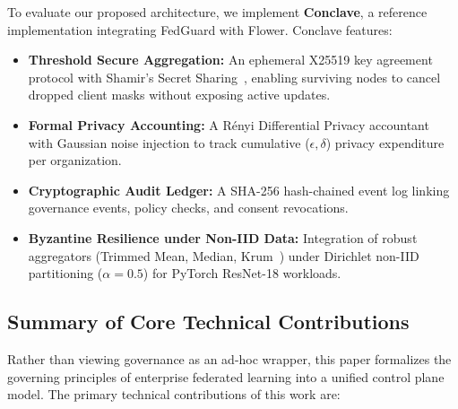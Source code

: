 To evaluate our proposed architecture, we implement \textbf{Conclave}, a reference implementation integrating FedGuard with Flower. Conclave features:
\begin{itemize}
    \item \textbf{Threshold Secure Aggregation:} An ephemeral X25519 key agreement protocol with Shamir's Secret Sharing~\cite{bonawitz2017practical, so2021lightsecagg}, enabling surviving nodes to cancel dropped client masks without exposing active updates.
    \item \textbf{Formal Privacy Accounting:} A R\'enyi Differential Privacy accountant~\cite{mironov2017renyi} with Gaussian noise injection to track cumulative ($\epsilon, \delta$) privacy expenditure per organization.
    \item \textbf{Cryptographic Audit Ledger:} A SHA-256 hash-chained event log linking governance events, policy checks, and consent revocations.
    \item \textbf{Byzantine Resilience under Non-IID Data:} Integration of robust aggregators (Trimmed Mean, Median, Krum~\cite{blanchard2017machine, yin2018byzantine}) under Dirichlet non-IID partitioning ($\alpha=0.5$) for PyTorch ResNet-18 workloads.
\end{itemize}

\subsection{Summary of Core Technical Contributions}

Rather than viewing governance as an ad-hoc wrapper, this paper formalizes the governing principles of enterprise federated learning into a unified control plane model. The primary technical contributions of this work are:

